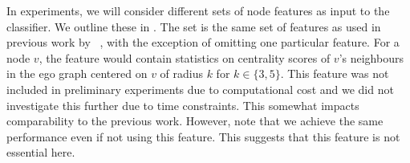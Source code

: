 \documentclass[
	fontsize=10pt, %
	twoside=true, %
	secnumdepth=1, %
  toc=indentunnumbered %
]{kaobook}
\begin{document}


In experiments, we will consider different sets of node features as input to the
classifier. We outline these  in
. The set  is the same set of
features as used in previous work by \nielsen{}~\cite{nielsen_MachineLearningSupport_2019}, with the exception of omitting
one particular feature. For a node $v$, the feature would contain statistics on
centrality scores of $v$'s neighbours in the ego graph centered on $v$ of radius
$k$ for $k \in \{3,5\}$. This feature was not included in preliminary
experiments due to computational cost and we did not investigate this further
due to time constraints. This somewhat impacts comparability to the previous
work. However, note that we achieve the same performance even if not using this
feature. This suggests that this feature is not essential here.
\end{document}
